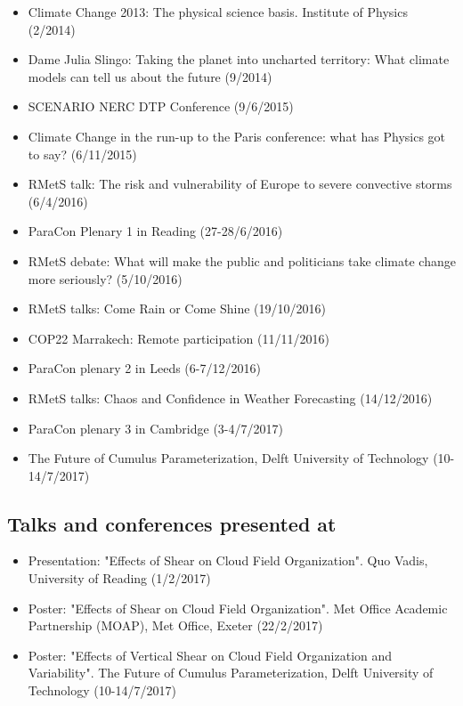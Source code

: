 \documentclass[11pt,a4paper]{article}
\begin{document}
\begin{itemize}
  \item Climate Change 2013: The physical science basis. Institute of Physics (2/2014)
  \item Dame Julia Slingo: Taking the planet into uncharted territory: What climate models can tell us about the future (9/2014)
  \item SCENARIO NERC DTP Conference (9/6/2015)
  \item Climate Change in the run-up to the Paris conference: what has Physics got to say? (6/11/2015)
  \item RMetS talk: The risk and vulnerability of Europe to severe convective storms (6/4/2016)
  \item ParaCon Plenary 1 in Reading (27-28/6/2016)
  \item RMetS debate: What will make the public and politicians take climate change more seriously? (5/10/2016)
  \item RMetS talks: Come Rain or Come Shine (19/10/2016)
  \item COP22 Marrakech: Remote participation (11/11/2016)
  \item ParaCon plenary 2 in Leeds (6-7/12/2016)
  \item RMetS talks: Chaos and Confidence in Weather Forecasting (14/12/2016)
  \item ParaCon plenary 3 in Cambridge (3-4/7/2017)
  \item The Future of Cumulus Parameterization, Delft University of Technology (10-14/7/2017)
\end{itemize}

\subsection*{Talks and conferences presented at}

\begin{itemize}
  \item Presentation: "Effects of Shear on Cloud Field Organization". Quo Vadis, University of Reading (1/2/2017)
  \item Poster: "Effects of Shear on Cloud Field Organization". Met Office Academic Partnership (MOAP), Met Office, Exeter (22/2/2017)
  \item Poster: "Effects of Vertical Shear on Cloud Field Organization and Variability". The Future of Cumulus Parameterization, Delft University of Technology (10-14/7/2017)
\end{itemize}
\end{document}

